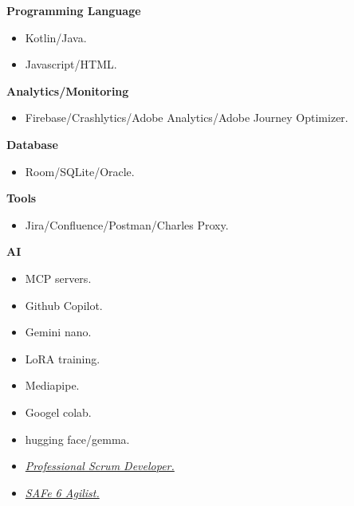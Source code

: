 \documentclass[10pt,a4paper,withhyper]{altacv}
\begin{document}
\begin{paracol}{2}
\textbf{Programming Language}

\begin{itemize}
	\item Kotlin/Java.
	\item Javascript/HTML.
\end{itemize}
\divider

\textbf{Analytics/Monitoring}

\begin{itemize}
	\item Firebase/Crashlytics/Adobe Analytics/Adobe Journey Optimizer.
\end{itemize}
\divider

\textbf{Database}

\begin{itemize}
	\item Room/SQLite/Oracle.
\end{itemize}
\divider

\textbf{Tools}

\begin{itemize}
	\item Jira/Confluence/Postman/Charles Proxy.
\end{itemize}
\divider

\textbf{AI}

\begin{itemize}
	\item MCP servers.
	\item Github Copilot.
	\item Gemini nano.
	\item LoRA training.
	\item Mediapipe.
		\item Googel colab.
	\item hugging face/gemma.
\end{itemize}




\divider

\divider




\begin{itemize}
\item \href{https://www.scrum.org/user/418540}{\textit{Professional Scrum Developer.}}
\item \href{https://drive.google.com/file/d/1NZk4r5TWXaY0Wp3Xjmo-ku7Hr-xPkmTo/view?usp=sharing}{\textit{SAFe 6 Agilist.}}
\end{itemize}


\end{paracol}
\end{document}
